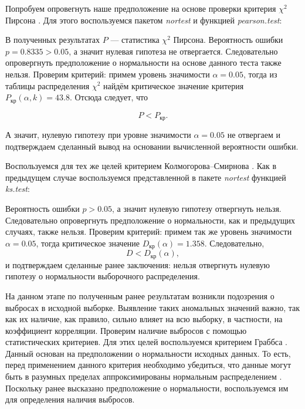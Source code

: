 Попробуем опровегнуть наше предположение на основе проверки критерия $\chi^2$ Пирсона \cite{Gmurman2003}. Для этого воспользуемся пакетом \textit{nortest} и функцией \textit{pearson.test}:

В полученных результатах $P$ --- статистика $\chi^2$ Пирсона. Вероятность ошибки $p = 0.8335 > 0.05$, а значит нулевая гипотеза не отвергается. Следовательно опровергнуть предположение о нормальности на основе данного теста также нельзя. Проверим критерий: примем уровень значимости $\alpha = 0.05$, тогда из таблицы распределения $\chi^2$ найдём критическое значение критерия $P_{\textrm{кр}}(\alpha, k) = 43.8$. Отсюда следует, что

\begin{equation*}
	P < P_{\textrm{кр}}.
\end{equation*}

А значит, нулевую гипотезу при уровне значимости $\alpha = 0.05$ не отвергаем и подтверждаем сделанный вывод на основании вычисленной вероятности ошибки. 

Воспользуемся для тех же целей критерием Колмогорова--Смирнова \cite{Mikulik2002}. Как в предыдущем случае воспользуемся представленной в пакете \textit{nortest} функцией \textit{ks.test}:

Вероятность ошибки $p > 0.05$, а значит нулевую гипотезу отвергнуть нельзя. Следовательно опровергнуть предположение о нормальности, как и предыдущих случаях, также нельзя. Проверим критерий: примем так же уровень значимости $\alpha = 0.05$, тогда критическое значение $D_{\textrm{кр}}(\alpha) = 1.358$. Следовательно,
\begin{equation*}
	D < D_{\textrm{кр}}(\alpha),
\end{equation*}
и подтверждаем сделанные ранее заключения: нельзя отвергнуть нулевую гипотезу о нормальности выборочного распределения.

На данном этапе по полученным ранее результатам возникли подозрения о выбросах в исходной выборке. Выявление таких аномальных значений важно, так как их наличие, как правило, сильно влияет на всю выборку, в частности, на коэффициент корреляции. Проверим наличие выбросов с помощью статистических критериев. Для этих целей воспользуемся критерием Граббса \cite{Grubbs1950Sample}. Данный основан на предположении о нормальности исходных данных. То есть, перед применением данного критерия необходимо убедиться, что данные могут быть в разумных пределах аппроксимированы нормальным распределением \cite{grubbs}. Поскольку ранее высказано предположение о нормальности, воспользуемся им для определения наличия выбросов.

